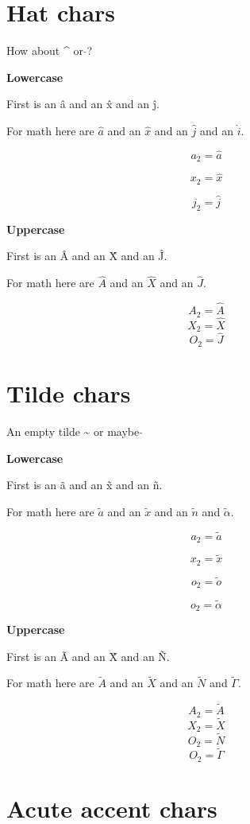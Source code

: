 \documentclass{article}
\begin{document}
\section{Hat chars}

How about \^{} or $\hat{}$? 

\textbf{Lowercase}

First is an \^{a} and an \^{x} and an \^{j}.

For math here are $\hat{a}$ and an $\hat{x}$ and an $\hat{j}$ and an $\hat{i}$.

$$a_2=\hat{a}$$

$$x_2=\hat{x}$$

$$j_2=\hat{j}$$

\textbf{Uppercase}

First is an \^{A} and an \^{X} and an \^{J}.

For math here are $\hat{A}$ and an $\hat{X}$ and an $\hat{J}$.

$$A_2=\hat{A}$$
$$X_2=\hat{X}$$
$$O_2=\hat{J}$$




\section{Tilde chars}

An empty tilde \~{} or maybe $\tilde{}$

\textbf{Lowercase}

First is an \~{a} and an \~{x} and an \~{n}.

For math here are $\tilde{a}$ and an $\tilde{x}$ and an $\tilde{n}$ and $\tilde{\alpha}$.

$$a_2=\tilde{a}$$

$$x_2=\tilde{x}$$

$$o_2=\tilde{o}$$

$$o_2=\tilde{\alpha}$$


\textbf{Uppercase}

First is an \~{A} and an \~{X} and an \~{N}.

For math here are $\tilde{A}$ and an $\tilde{X}$ and an $\tilde{N}$ and $\tilde{\Gamma}$.

$$A_2=\tilde{A}$$
$$X_2=\tilde{X}$$
$$O_2=\tilde{N}$$
$$O_2=\tilde{\Gamma}$$




\section{Acute accent chars}
\end{document}
